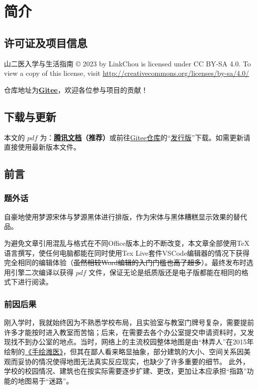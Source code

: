 \chapter[简介]{简介}

\section[许可证及项目信息]{许可证及项目信息}
山二医入学与生活指南 © 2023 by LinkChou is licensed under CC BY-SA 4.0. To view a copy of this license, visit \uline{\href{http://creativecommons.org/licenses/by-sa/4.0/}{http://creativecommons.org/licenses/by-sa/4.0/}}

仓库地址为\textbf{\uline{\href{https://gitee.com/mikazo/guide_for_freshman}{Gitee}}}，欢迎各位参与项目的贡献！

\section[\textcolor{red}{下载与更新}]{下载与更新}
本文的 $pdf$ \textbf{}为：\textbf{\uline{\textcolor{red}{\href{https://docs.qq.com/s/ETcQ-ZFSrSsh6MK9bm773q}{腾讯文档}}}（推荐）}或前往\uline{\href{https://gitee.com/mikazo/guide_for_freshman}{Gitee仓库}}的“\uline{\href{https://gitee.com/mikazo/latex_version/releases/latest}{发行版}}”下载。如需更新请直接使用最新版本文件。

\section[前言]{前言}
\subsection[题外话]{题外话}
自豪地使用梦源宋体与梦源黑体进行排版，作为宋体与黑体糟糕显示效果的替代品。

为避免文章引用混乱与格式在不同Office版本上的不断改变，本文章全部使用\TeX 语言撰写，使任何电脑都能在同时使用Tex Live套件VSCode编辑器\footnotemark 的情况下获得完全相同的编辑体验（\sout{虽然相较Word编辑的入门门槛也高了超多}）。最终发布时选用\XeLaTeX 引擎二次编译以获得 $pdf$ 文件，保证无论是纸质版还是电子版都能在相同的格式下进行阅读。

\subsection[前因后果]{前因后果}
刚入学时，我就始终因为不熟悉学校布局，且实验室与教室门牌号复杂，需要提前许多才能按时进入教室而苦恼；后来，在需要去各个办公室提交申请资料时，又发现找不到办公室的地点。当时，网络上的主流校园整体地图是由“林弄人”在2015年绘制的\uline{\href{https://www.zcool.com.cn/work/ZMTgxMDQwMjg=.html?}{《手绘潍医》}}，但其在鄙人看来略显抽象，部分建筑的大小、空间关系因美观而妥协的情况使得地图无法真实反应现实，也缺少了许多重要的细节。
此外，学校的校园情况、建筑也在按实际需要逐步扩建、更改，更加让本应承担“指路”功能的地图易于“迷路”。


